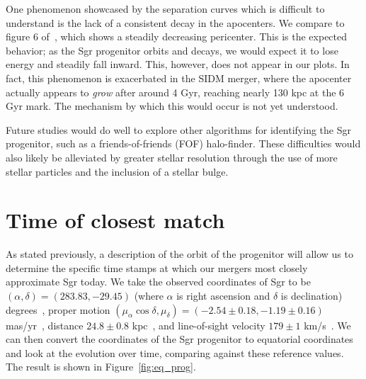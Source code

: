 One phenomenon showcased by the separation curves which is difficult to
understand is the lack of a consistent decay in the apocenters. We compare to
figure 6 of~\cite{dierickx_predicted_2017}, which shows a steadily decreasing
pericenter.  This is the expected behavior; as the Sgr progenitor orbits and
decays, we would expect it to lose energy and steadily fall inward.  This,
however, does not appear in our plots.  In fact, this phenomenon is
exacerbated in the SIDM merger, where the apocenter actually appears to
\textit{grow} after around 4 Gyr, reaching nearly 130 kpc at the 6 Gyr mark.
The mechanism by which this would occur is not yet understood.

Future studies would do well to explore other algorithms for identifying the Sgr
progenitor, such as a friends-of-friends (FOF) halo-finder. These difficulties
would also likely be alleviated by greater stellar resolution through the use of
more stellar particles and the inclusion of a stellar bulge. 


\hypertarget{time-of-closest-match}{%
\section{Time of closest match}\label{time-of-closest-match}}

As stated previously, a description of the orbit of the progenitor will allow us
to determine the specific time stamps at which our mergers most closely
approximate Sgr today.  We take the observed coordinates of Sgr to be
$(\alpha, \delta) = (283.83, -29.45)$ (where $\alpha$ is right ascension and
$\delta$ is declination) degrees~\cite{nasa_nasaipac_nodate}, proper motion
$(\mu_\alpha \cos\delta, \mu_\delta) = (-2.54 \pm 0.18, -1.19 \pm 0.16)$
mas/yr~\cite{massari_hubble_2013}, distance $24.8 \pm 0.8$
kpc~\cite{kunder_distance_2009}, and line-of-sight velocity $179 \pm 1$
km/s~\cite{dierickx_predicted_2017,bellazzini_nucleus_2008}. We can then convert
the coordinates of the Sgr progenitor to equatorial coordinates and look at the
evolution over time, comparing against these reference values. The result is
shown in Figure~\ref{fig:eq_prog}.

